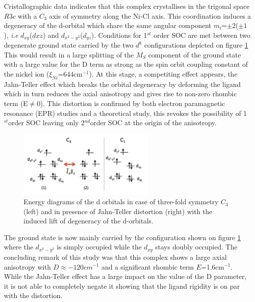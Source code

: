 \documentclass[10pt]{report}
\numberwithin{equation}{section}
\begin{document}
Cristallographic data indicates that this complex crystallises in the trigonal space $R3c$ with a $C_3$ axis of symmetry along the Ni-Cl axis.
This coordination induces a degeneracy of the d-orbital which share the same angular component $m_l$=$\pm2$($\pm1$), \textit{i.e} $d_{xy}$($d{xz}$) and $d_{x^2-y^2}$($d_{yz}$). 
Conditions for 1$^{st}$ order SOC are met between two degenerate ground state carried by the two $d^8$ configurations depicted on figure \ref{NiMe6tren_config}
This would result in a large splitting of the $M_S$ component of the ground state with a large value for the D term as strong as the spin orbit coupling constant of the nickel ion ($\xi_{Ni}$=644cm$^{-1}$).
At this stage, a competiting effect appears, the Jahn-Teller effect which breaks the orbital degeneracy by deforming the ligand which in turn reduces the axial anisotropy and gives rise to non-zero rhombic term (E$\neq$0).
This distortion is confirmed by both electron paramagnetic resonance (EPR) studies and a theoretical study, this revokes the possibility of 1$^{st}$order SOC leaving only 2$^{nd}$order SOC at the origin of the anisotropy.

\begin{figure}
    \centering
    \includegraphics[width=0.6\textwidth]{Images/NiMe6tren_config.png}
    \caption{Energy diagrams of the d orbitals in case of three-fold symmetry $C_3$ (left) and in presence of Jahn-Teller distortion (right) with the induced lift of degeneracy of the d-orbitals. }
    \label{NiMe6tren_config}
\end{figure}

The ground state is now mainly carried by the configuration shown on figure \ref{NiMe6tren_config} where the $d_{x^2-y^2}$ is simply occupied while the $d_{xy}$ stays doubly occupied.
The concluding remark of this study was that this complex shows a large axial anisotropy with $D\approx-120cm^{-1}$ and a significant rhombic term $E$=1.6cm$^{-1}$. 
While the Jahn-Teller effect has a large impact on the value of the D parameter, it is not able to completely negate it showing that the ligand rigidity is on par with the distortion.
\end{document}
